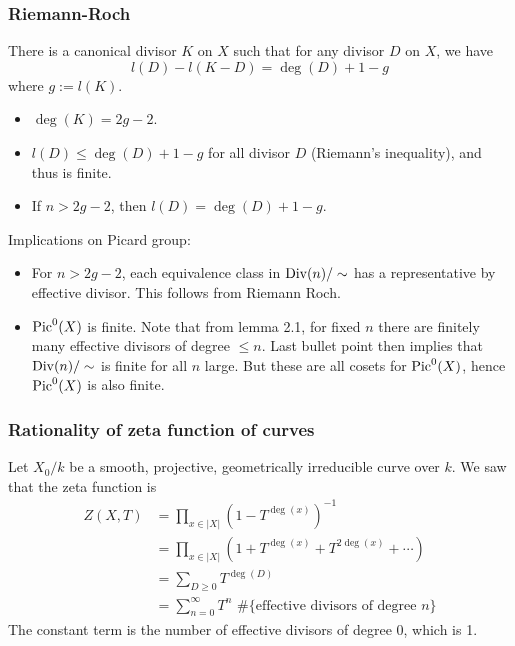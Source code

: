 \subsubsection{Riemann-Roch}
\begin{thm}
There is a canonical divisor $K$ on $X$ such that for any divisor $D$ on $X$, we have
\[
l(D) - l(K-D) = \deg(D) + 1 - g
\]
where $g := l(K)$.
\end{thm}
\begin{cor} \hspace{1mm}
\begin{itemize}
    \item $\deg(K) = 2g-2$.
    \item $l(D) \leq \deg(D) + 1 -g$ for all divisor $D$ (Riemann's inequality), and thus is finite.
    \item If $n > 2g-2$, then $l(D) = \deg(D) + 1 - g$.
\end{itemize}
\end{cor}
\begin{cor} Implications on Picard group:
\begin{itemize}
    \item For $n > 2g-2$, each equivalence class in $\operatorname{Div}(n)/\sim$ has a representative by effective divisor. This follows from Riemann Roch. 
    \item $\operatorname{Pic}^0(X)$ is finite. Note that from lemma 2.1, for fixed $n$ there are finitely many effective divisors of degree $\leq n$. Last bullet point then implies that $\operatorname{Div}(n)/\sim$ is finite for all $n$ large. But these are all cosets for $\operatorname{Pic}^0(X)$, hence $\operatorname{Pic}^0(X)$ is also finite.
\end{itemize}
\end{cor}
\subsubsection{Rationality of zeta function of curves}
Let $X_0/k$ be a smooth, projective, geometrically irreducible curve over $k$. We saw that the zeta function is
\begin{align*}
    Z(X,T) &= \prod_{x \in |X|} \left(1 - T^{\deg(x)}\right)^{-1} \nonumber\\
    &= \prod_{x \in |X|} ( 1 + T^{\deg(x)} + T^{2\deg(x)} + \cdots ) \nonumber\\
    &= \sum_{D \ge 0} T^{\deg(D)} \nonumber\\
    &= \sum_{n=0}^{\infty} T^n \text{ \#\{effective divisors of degree $n$\}} \label{zeta_for_curve} \tag{$\star$}
\end{align*}
The constant term is the number of effective divisors of degree 0, which is 1.

